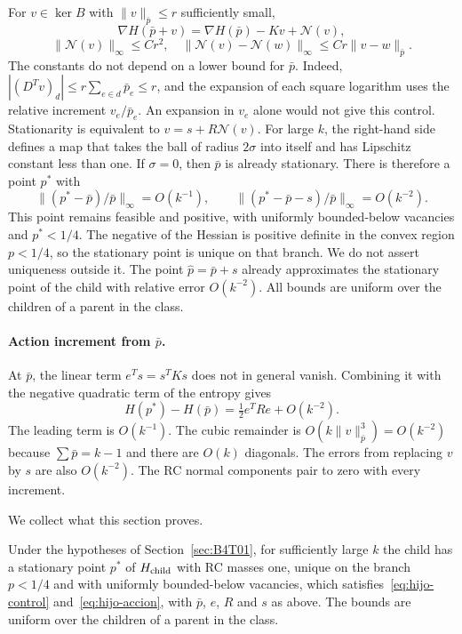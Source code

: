For $v\in\ker B$ with $\|v\|_{\bar p}\le r$ sufficiently small,
\[
 \nabla H(\bar p+v)=\nabla H(\bar p)-Kv+\mathcal N(v),
\]
\[
 \|\mathcal N(v)\|_\infty\le Cr^2,\quad
 \|\mathcal N(v)-\mathcal N(w)\|_\infty\le Cr\|v-w\|_{\bar p}.
\]
The constants do not depend on a lower bound for $\bar p$. Indeed, $|(D^Tv)_d|\le r\sum_{e\in d}\bar p_e\le
r$, and the expansion of each square logarithm uses the relative increment $v_e/\bar p_e$. An expansion in
$v_e$ alone would not give this control.
Stationarity is equivalent to $v=s+R\mathcal N(v)$.
For large $k$, the right-hand side defines a map that takes the ball of radius $2\sigma$ into itself and has
Lipschitz constant less than one. If $\sigma=0$, then $\bar p$ is already stationary.
There is therefore a point $p^*$ with
\begin{equation}\label{eq:hijo-control}
 \boxed{\|(p^*-\bar p)/\bar p\|_\infty=O(k^{-1}),\qquad
 \|(p^*-\bar p-s)/\bar p\|_\infty=O(k^{-2}).}
\end{equation}
This point remains feasible and positive, with uniformly bounded-below vacancies and $p^*<1/4$.
The negative of the Hessian is positive definite in the convex region $p<1/4$, so the stationary point is
unique on that branch. We do not assert uniqueness outside it. The point $\widehat p=\bar p+s$ already
approximates the stationary point of the child with relative error $O(k^{-2})$. All bounds are uniform over
the children of a parent in the class.

\paragraph{Action increment from $\bar p$.}
At $\bar p$, the linear term $e^Ts=s^TKs$ does not in general vanish. Combining it with the negative
quadratic term of the entropy gives
\begin{equation}\label{eq:hijo-accion}
 \boxed{H(p^*)-H(\bar p)=\tfrac12 e^TRe+O(k^{-2}).}
\end{equation}
The leading term is $O(k^{-1})$. The cubic remainder is $O(k\|v\|_{\bar p}^3)=O(k^{-2})$ because $\sum\bar
p=k-1$ and there are $O(k)$ diagonals. The errors from replacing $v$ by $s$ are also $O(k^{-2})$. The RC
normal components pair to zero with every increment.

We collect what this section proves.
\begin{lemasub}\label{lem:hijo}
Under the hypotheses of Section~\ref{sec:B4T01}, for sufficiently large $k$ the child has a
stationary point $p^*$ of $H_{\rm child}$ with RC masses one, unique on the branch $p<1/4$ and with
uniformly bounded-below vacancies, which satisfies~\eqref{eq:hijo-control} and~\eqref{eq:hijo-accion},
with $\bar p$, $e$, $R$ and $s$ as above. The bounds are uniform over the children of a parent in the class.
\end{lemasub}
